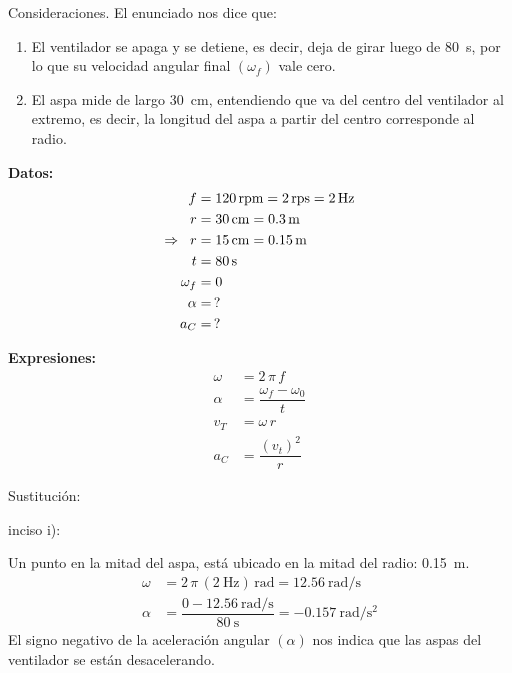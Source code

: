 \documentclass[12pt]{article}
\begin{document}
\begin{enumerate}
Consideraciones. El enunciado nos dice que:
\begin{enumerate}
\item El ventilador se apaga y se detiene, es decir, deja de girar luego de \SI{80}{\second}, por lo que su velocidad angular final $(\omega_{f})$ vale cero.
\item El aspa mide de largo \SI{30}{\centi\meter}, entendiendo que va del centro del ventilador al extremo, es decir, la longitud del aspa a partir del centro corresponde al radio.
\end{enumerate}

\vspace*{0.5cm}
\begin{minipage}[t]{0.4\linewidth}
\textbf{Datos:}
\begin{align*}
f &= 120 \, \text{rpm} = 2 \, \text{rps} = \SI{2}{\hertz} \\
r &= \SI{30}{\centi\meter} = \SI{0.3}{\meter} \\
\Rightarrow \hspace{0.2cm} r &= \SI{15}{\centi\meter} = \SI{0.15}{\meter} \\
t &= \SI{80}{\second} \\
\omega_{f} &= 0 \\
\alpha &= \, ? \\
a_{C} &= \, ? \\
\end{align*}
\end{minipage}
\begin{minipage}[t]{0.4\linewidth}
\textbf{Expresiones:}
\begin{align*}
\omega &= 2 \, \pi \, f \\[0.5em]
\alpha &= \dfrac{\omega_{f} - \omega_{0}}{t} \\[0.5em]
v_{T} &= \omega \, r \\[0.5em]
a_{C} &= \dfrac{(v_{t})^{2}}{r}
\end{align*}
\end{minipage}
\end{enumerate}

Sustitución:

inciso i):

Un punto en la mitad del aspa, está ubicado en la mitad del radio: \SI{0.15}{\meter}.
\begin{align*}
\omega &= 2 \, \pi \, \left( \SI{2}{\hertz} \right) \, \unit{\radian} = \SI[per-mode=fraction]{12.56}{\radian\per\second} \\
\alpha &= \dfrac{ \displaystyle0 - \SI[per-mode=fraction]{12.56}{\radian\per\second}}{\SI{80}{\second}} = - \SI[per-mode=fraction]{0.157}{\radian\per\square\second}
\end{align*}
El signo negativo de la aceleración angular $(\alpha)$ nos indica que las aspas del ventilador se están desacelerando. 
\end{document}
